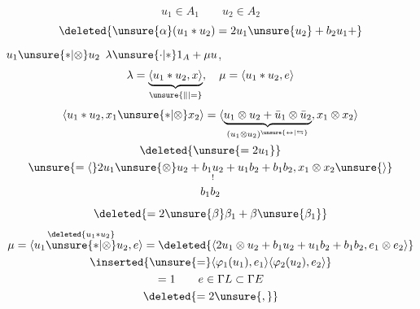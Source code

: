 \[u_1\in A_1\qquad u_2\in A_2\]
  
\[\deleted{\unsure{\alpha}(u_1\ast u_2)=2u_1\unsure{u_2}+b_2u_1+}\]
$u_1\unsure{\ast|\otimes}u_2$  $\lambda\unsure{\cdot|\ast}1_A+\mu u$,  
\[
\lambda=\underbrace{\langle u_1\ast u_2,x\rangle}_{\unsure{\parallel|=}},\quad
\mu=\langle u_1\ast u_2,e\rangle
\]
\[
\begin{gathered}
\langle u_1\ast u_2,x_1\unsure{\ast|\otimes}x_2\rangle
=\langle\underbrace{u_1\otimes u_2+\bar u_1\otimes\bar u_2}_{(u_1\otimes u_2)^{\unsure{\leftrightarrow|\leftrightarrows}}},x_1\otimes x_2\rangle\\
\deleted{\unsure{=2u_1}}\\
\unsure{=\langle}2u_1\unsure{\otimes}u_2+\underset{!}{b_1u_2}+u_1b_2+b_1b_2,x_1\otimes x_2\unsure{\rangle}\\
b_1b_2
\end{gathered}
\]
\[\deleted{=2\unsure{\beta}\beta_1+\beta\unsure{\beta_1}}\]
\[
\begin{gathered}
\mu=\langle\overset{\deleted{u_1\ast u_2}}{u_1\unsure{\ast|\otimes}u_2},e\rangle
=\deleted{\langle2u_1\otimes u_2+b_1u_2+u_1b_2+b_1b_2,e_1\otimes e_2\rangle}\\
\inserted{\unsure{=}\langle\varphi_1(u_1),e_1\rangle\langle\varphi_2(u_2),e_2\rangle}\\
=1\qquad e\in\Gamma L\subset\Gamma E\\
\deleted{=2\unsure{,}}
\end{gathered}
\]
